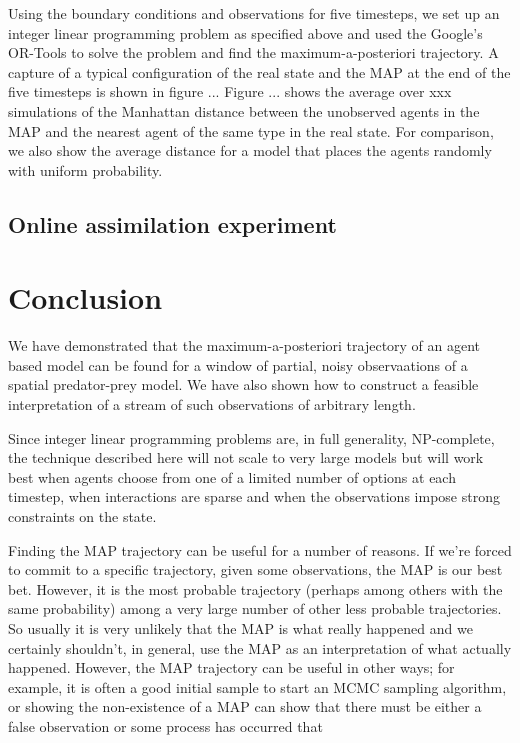 \documentclass{article}
\begin{document}
Using the boundary conditions and observations for five timesteps, we set up an integer linear programming problem as specified above and used the Google's OR-Tools\cite{googleortools} to solve the problem and find the maximum-a-posteriori trajectory. A capture of a typical configuration of the real state and the MAP at the end of the five timesteps is shown in figure ... Figure ... shows the average over xxx simulations of the Manhattan distance between the unobserved agents in the MAP and the nearest agent of the same type in the real state. For comparison, we also show the average distance for a model that places the agents randomly with uniform probability.

\subsection{Online assimilation experiment}




\section{Conclusion}

We have demonstrated that the maximum-a-posteriori trajectory of an agent based model can be found for a window of partial, noisy observaations of a spatial predator-prey model. We have also shown how to construct a feasible interpretation of a stream of such observations of arbitrary length.

Since integer linear programming problems are, in full generality, NP-complete, the technique described here will not scale to very large models but will work best when agents choose from one of a limited number of options at each timestep, when interactions are sparse and when the observations impose strong constraints on the state.

Finding the MAP trajectory can be useful for a number of reasons. If we're forced to commit to a specific trajectory, given some observations, the MAP is our best bet. However, it is the most probable trajectory (perhaps among others with the same probability) among a very large number of other less probable trajectories. So usually it is very unlikely that the MAP is what really happened and we certainly shouldn't, in general, use the MAP as an interpretation of what actually happened. However, the MAP trajectory can be useful in other ways; for example, it is often a good initial sample to start an MCMC sampling algorithm, or showing the non-existence of a MAP can show that there must be either a false observation or some process has occurred that 


%
% 


\end{document}
